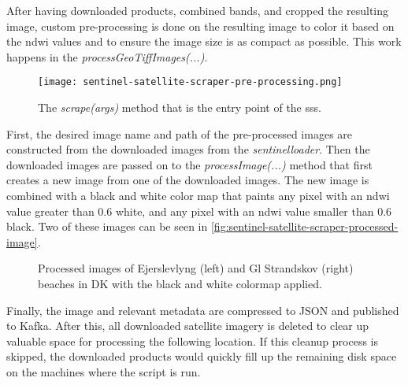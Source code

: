 After having downloaded products, combined bands, and cropped the resulting image, custom pre-processing is done on the resulting image to color it based on the \acrshort{ndwi} values and to ensure the image size is as compact as possible. This work happens in the \emph{processGeoTiffImages(...)}.

\begin{figure}[h!]
    \centering
    \texttt{[image: sentinel-satellite-scraper-pre-processing.png]}
    \caption{The \emph{scrape(args)} method that is the entry point of the \acrshort{sss}.}
    \label{fig:sentinel-satellite-scraper-pre-processing}
\end{figure}

First, the desired image name and path of the pre-processed images are constructed from the downloaded images from the \emph{sentinelloader}. Then the downloaded images are passed on to the \emph{processImage(...)} method that first creates a new image from one of the downloaded images. The new image is combined with a black and white color map that paints any pixel with an \acrshort{ndwi} value greater than 0.6 white, and any pixel with an \acrshort{ndwi} value smaller than 0.6 black. Two of these images can be seen in \autoref{fig:sentinel-satellite-scraper-processed-image}.

\begin{figure}[h!]
    \centering
    \caption{Processed images of Ejerslevlyng (left) and Gl Strandskov (right) beaches in DK with the black and white colormap applied.}
    \label{fig:sentinel-satellite-scraper-processed-image}
\end{figure}

Finally, the image and relevant metadata are compressed to JSON and published to Kafka. After this, all downloaded satellite imagery is deleted to clear up valuable space for processing the following location. If this cleanup process is skipped, the downloaded products would quickly fill up the remaining disk space on the machines where the script is run.




